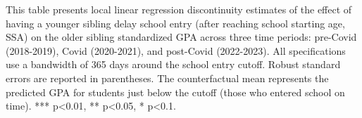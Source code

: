 \documentclass[AER]{AEA}
\begin{document}
\begin{table}[htbp]
\centering
\caption{Effect of Younger Sibling Delayed School Entry on Standardized GPA before, during and after the Pandemic}
\label{tab:rd_gpa}
\begin{tablenotes}
\footnotesize
This table presents local linear regression discontinuity estimates of the effect of having a younger sibling delay school entry (after reaching school starting age, SSA) on the older sibling standardized GPA across three time periods: pre-Covid (2018-2019), Covid (2020-2021), and post-Covid (2022-2023). All specifications use a bandwidth of 365 days around the school entry cutoff. Robust standard errors are reported in parentheses. The counterfactual mean represents the predicted GPA for students just below the cutoff (those who entered school on time). *** p<0.01, ** p<0.05, * p<0.1.
\end{tablenotes}
\end{table}
\end{document}

